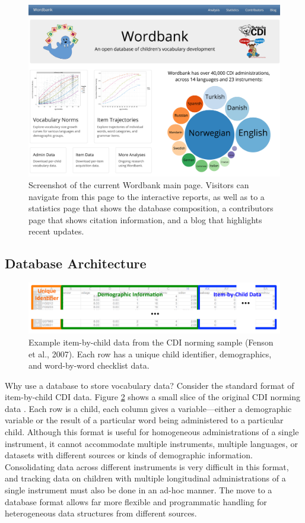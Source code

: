 \documentclass[man,noapacite]{apa2}
\begin{document}
\begin{figure}[h!]
\includegraphics[width=6.4in]{figures/screenshot.png}
\caption{\label{fig:screenshot} Screenshot of the current Wordbank main page. Visitors can navigate from this page to the interactive reports, as well as to a statistics page that shows the database composition, a contributors page that shows citation information, and a blog that highlights recent updates.}
\end{figure}

\subsection{Database Architecture}

\begin{figure}[t]
\centering
\includegraphics[width=5in]{figures/itembychild.pdf}
\caption{\label{fig:data} Example item-by-child data from the CDI norming sample (Fenson et al., 2007). Each row has a unique child identifier, demographics, and word-by-word checklist data. }
\end{figure}

Why use a database to store vocabulary data? Consider the standard format of item-by-child CDI data. Figure \ref{fig:data} shows a small slice of the original CDI norming data \cite{fenson1994,fenson2007}. Each row is a child, each column gives a variable---either a demographic variable or the result of a particular word being administered to a particular child. Although this format is useful for homogeneous administrations of a single instrument, it cannot accommodate multiple instruments, multiple languages, or datasets with different sources or kinds of demographic information. Consolidating data across different instruments is very difficult in this format, and tracking data on children with multiple longitudinal administrations of a single instrument must also be done in an ad-hoc manner. The move to a database format allows far more flexible and programmatic handling for heterogeneous data structures from different sources. 
\end{document}
